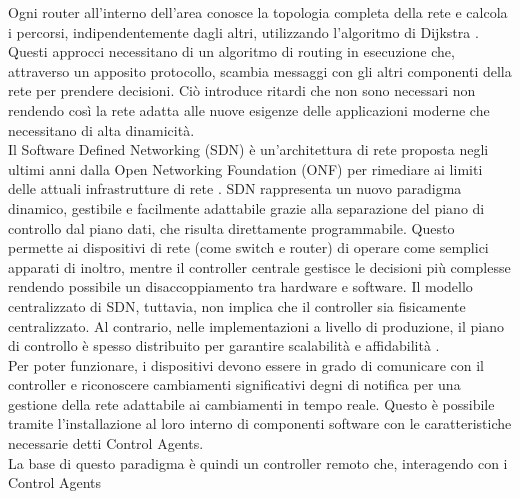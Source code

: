 Ogni router all'interno dell'area conosce la topologia completa della rete e calcola i percorsi, indipendentemente dagli altri, utilizzando l'algoritmo di Dijkstra \cite{ospf}. 
\\Questi approcci necessitano di un algoritmo di routing in esecuzione che, attraverso un apposito protocollo, 
scambia messaggi con gli altri componenti della rete per prendere decisioni. 
Ciò introduce ritardi che non sono necessari non rendendo così la rete adatta alle nuove esigenze delle applicazioni moderne che necessitano di alta dinamicità.
\\Il Software Defined Networking (SDN) è un'architettura di rete proposta negli ultimi anni dalla Open Networking Foundation (ONF) \cite{ONF} per rimediare ai limiti delle attuali infrastrutture di rete \cite{sdnsurvey}.
SDN rappresenta un nuovo paradigma dinamico, gestibile e facilmente adattabile grazie alla separazione del piano di controllo dal piano dati, che risulta direttamente programmabile. 
Questo permette ai dispositivi di rete (come switch e router) di operare come semplici apparati di inoltro, mentre il controller centrale gestisce le decisioni più complesse rendendo possibile un disaccoppiamento tra hardware e software.
Il modello centralizzato di SDN, tuttavia, non implica che il controller sia fisicamente centralizzato. 
Al contrario, nelle implementazioni a livello di produzione, il piano di controllo è spesso distribuito per garantire scalabilità e affidabilità \cite{sdnlayers}.
\\Per poter funzionare, i dispositivi devono essere in grado di comunicare con il controller e riconoscere cambiamenti significativi degni di notifica per una gestione della rete adattabile ai cambiamenti in tempo reale. 
Questo è possibile tramite l'installazione al loro interno di componenti software con le caratteristiche necessarie
detti Control Agents.
\\La base di questo paradigma è quindi un controller remoto che, interagendo con i Control Agents

